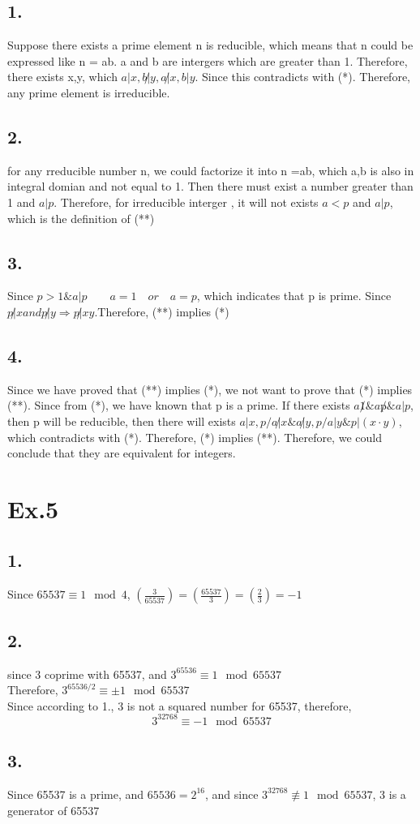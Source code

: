 \documentclass[a4paper,12pt]{journal}
\begin{document}
	 \subsection*{1. }
	 Suppose there exists a prime element n is reducible, which means that n could be expressed like n = ab. a and b are intergers which are greater than 1. Therefore, there exists x,y, which $a|x,b\not | y, a\not|x,b | y$. Since this contradicts with (*). Therefore, any prime element is irreducible.
	 \subsection*{2.}
	  for any rreducible number n, we could factorize it into n =ab, which a,b is also in integral domian and not equal to 1. Then there must exist a number greater than 1 and $a |p$. Therefore, for  irreducible interger , it will not exists $a<p$ and $a|p$, which is the definition of (**)
	  \subsection*{3.}
	  Since $p>1 \& a|p\qquad a=1 \quad or\quad a=p$, which indicates that p is prime. Since $p\not |x and p\not |y\Rightarrow p\not |xy$.Therefore, (**) implies (*)
	  \subsection*{4.}
	  Since we have proved that (**) implies (*), we not want to prove that (*) implies (**). Since from (*), we have known that p is a prime. If there exists $a\not 1 \& a\not p \& a|p$, then p will be reducible, then there will exists $a|x, p/a\not |x\& a\not|y, p/a |y\& p|(x\cdot y)$, which contradicts with (*). Therefore, (*) implies (**).
	  Therefore, we could conclude that they are equivalent for integers.
	  \section*{Ex.5}
	  \subsection*{1.}
	  Since $65537\equiv 1\mod 4$, $\left(\frac{3}{65537}\right)=\left(\frac{65537}{3}\right)=\left(\frac{2}{3}\right)=-1$
	  \subsection*{2.}
	  since 3 coprime with 65537, and $3^{65536}\equiv 1\mod 65537$\\
	  Therefore, $3^{65536/2}\equiv\pm1\mod 65537$\\
	  Since according to 1., 3 is not a squared number for 65537, therefore, 
	  $$3^{32768}\equiv-1\mod 65537$$
	  \subsection*{3.}
	  Since 65537 is a prime, and $65536=2^16$, and since $3^{32768}\not\equiv1\mod65537$, 3 is a generator of 65537
	  
 
\end{document}
